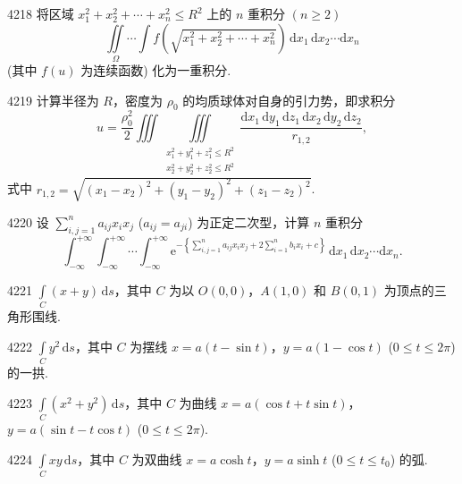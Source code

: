 \begin{prob}[M]{4218}
将区域 $x_1^2 + x_2^2 + \cdots + x_n^2 \leqslant R^2$ 上的 $n$ 重积分 $(n \geqslant 2)$
\[
\iint\limits_\Omega \cdots \int f\left(\sqrt{x_1^2+x_2^2+\cdots+x_n^2}\right)\,\mathrm{d}x_1\,\mathrm{d}x_2 \cdots \mathrm{d}x_n
\]
(其中 $f(u)$ 为连续函数) 化为一重积分.
\end{prob}

\begin{prob}[M]{4219}
计算半径为 $R$，密度为 $\rho_0$ 的均质球体对自身的引力势，即求积分
\[
u = \frac{\rho_0^2}{2} \iiint\iiint\limits_{\substack{x_1^2+y_1^2+z_1^2 \leqslant R^2 \\ x_2^2+y_2^2+z_2^2 \leqslant R^2}} \frac{\mathrm{d}x_1\,\mathrm{d}y_1\,\mathrm{d}z_1\,\mathrm{d}x_2\,\mathrm{d}y_2\,\mathrm{d}z_2}{r_{1,2}},
\]
式中 $r_{1,2} = \sqrt{(x_1-x_2)^2 + (y_1-y_2)^2 + (z_1-z_2)^2}$.
\end{prob}

\begin{prob}[M]{4220}
设 $\sum_{i,j=1}^n a_{ij} x_i x_j$ ($a_{ij}=a_{ji}$) 为正定二次型，计算 $n$ 重积分
\[
\int_{-\infty}^{+\infty} \int_{-\infty}^{+\infty} \cdots \int_{-\infty}^{+\infty} \mathrm{e}^{-\left\{\sum_{i,j=1}^n a_{ij} x_i x_j + 2\sum_{i=1}^n b_i x_i + c\right\}}\,\mathrm{d}x_1\,\mathrm{d}x_2 \cdots \mathrm{d}x_n.
\]
\end{prob}



\begin{prob}[S]{4221}
$\displaystyle \int\limits_C (x+y)\,\mathrm{d}s$，其中 $C$ 为以 $O(0,0)$，$A(1,0)$ 和 $B(0,1)$ 为顶点的三角形围线.
\end{prob}

\begin{prob}[S]{4222}
$\displaystyle \int\limits_C y^2\,\mathrm{d}s$，其中 $C$ 为摆线 $x = a(t - \sin t)$，$y = a(1 - \cos t)$ ($0 \leqslant t \leqslant 2\pi$) 的一拱.
\end{prob}

\begin{prob}[S]{4223}
$\displaystyle \int\limits_C (x^2+y^2)\,\mathrm{d}s$，其中 $C$ 为曲线 $x = a(\cos t + t\sin t)$，$y = a(\sin t - t\cos t)$ ($0 \leqslant t \leqslant 2\pi$).
\end{prob}

\begin{prob}[S]{4224}
$\displaystyle \int\limits_C xy\,\mathrm{d}s$，其中 $C$ 为双曲线 $x = a\cosh t$，$y = a\sinh t$ ($0 \leqslant t \leqslant t_0$) 的弧.
\end{prob}

